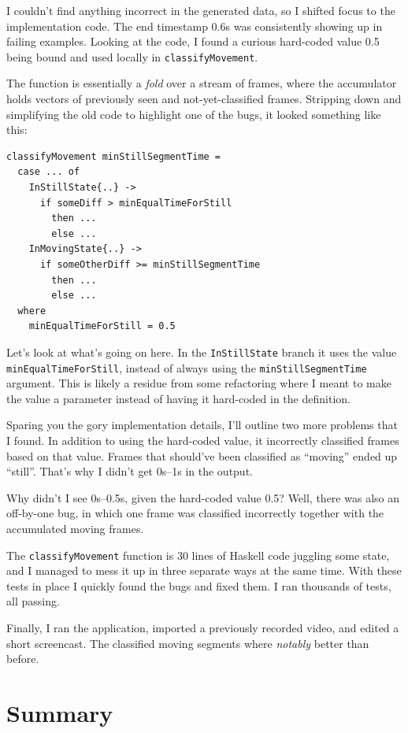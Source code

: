 I couldn't find anything incorrect in the generated data, so I shifted focus to the implementation code. The end timestamp 0.6s was consistently showing up in failing examples. Looking at the code, I found a curious hard-coded value 0.5 being bound and used locally in \texttt{classifyMovement}.

The function is essentially a \textit{fold} over a stream of frames, where the accumulator holds vectors of previously seen and not-yet-classified frames. Stripping down and simplifying the old code to highlight one of the bugs, it looked something like this:

\begin{verbatim}
classifyMovement minStillSegmentTime =
  case ... of
    InStillState{..} ->
      if someDiff > minEqualTimeForStill
        then ...
        else ...
    InMovingState{..} ->
      if someOtherDiff >= minStillSegmentTime
        then ...
        else ...
  where
    minEqualTimeForStill = 0.5
\end{verbatim}
Let's look at what's going on here. In the \texttt{InStillState} branch it uses the value \texttt{minEqualTimeForStill}, instead of always using the \texttt{minStillSegmentTime} argument. This is likely a residue from some refactoring where I meant to make the value a parameter instead of having it hard-coded in the definition.

Sparing you the gory implementation details, I'll outline two more problems that I found. In addition to using the hard-coded value, it incorrectly classified frames based on that value. Frames that should've been classified as ``moving'' ended up ``still''. That's why I didn't get 0s--1s in the output.

Why didn't I see 0s--0.5s, given the hard-coded value 0.5? Well, there was also an off-by-one bug, in which one frame was classified incorrectly together with the accumulated moving frames.

The \texttt{classifyMovement} function is 30 lines of Haskell code juggling some state, and I managed to mess it up in three separate ways at the same time. With these tests in place I quickly found the bugs and fixed them. I ran thousands of tests, all passing.

Finally, I ran the application, imported a previously recorded video, and edited a short screencast. The classified moving segments where \textit{notably} better than before.

\section{Summary}


